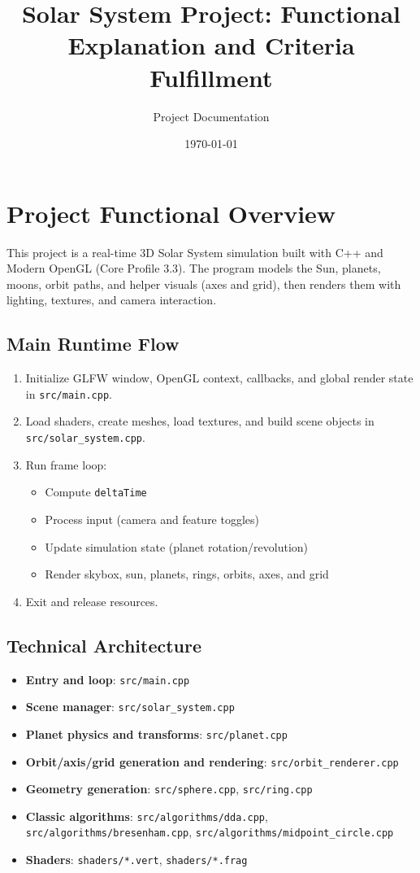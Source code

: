 \documentclass[11pt,a4paper]{article}
\title{Solar System Project: Functional Explanation and Criteria Fulfillment}
\author{Project Documentation}
\date{\today}
\begin{document}
\maketitle
\tableofcontents
\newpage

\section{Project Functional Overview}

This project is a real-time 3D Solar System simulation built with C++ and Modern OpenGL (Core Profile 3.3). The program models the Sun, planets, moons, orbit paths, and helper visuals (axes and grid), then renders them with lighting, textures, and camera interaction.

\subsection{Main Runtime Flow}
\begin{enumerate}[leftmargin=*]
    \item Initialize GLFW window, OpenGL context, callbacks, and global render state in \texttt{src/main.cpp}.
    \item Load shaders, create meshes, load textures, and build scene objects in \texttt{src/solar\_system.cpp}.
    \item Run frame loop:
    \begin{itemize}[leftmargin=*]
        \item Compute \texttt{deltaTime}
        \item Process input (camera and feature toggles)
        \item Update simulation state (planet rotation/revolution)
        \item Render skybox, sun, planets, rings, orbits, axes, and grid
    \end{itemize}
    \item Exit and release resources.
\end{enumerate}

\subsection{Technical Architecture}
\begin{itemize}[leftmargin=*]
    \item \textbf{Entry and loop}: \texttt{src/main.cpp}
    \item \textbf{Scene manager}: \texttt{src/solar\_system.cpp}
    \item \textbf{Planet physics and transforms}: \texttt{src/planet.cpp}
    \item \textbf{Orbit/axis/grid generation and rendering}: \texttt{src/orbit\_renderer.cpp}
    \item \textbf{Geometry generation}: \texttt{src/sphere.cpp}, \texttt{src/ring.cpp}
    \item \textbf{Classic algorithms}: \texttt{src/algorithms/dda.cpp}, \texttt{src/algorithms/bresenham.cpp}, \texttt{src/algorithms/midpoint\_circle.cpp}
    \item \textbf{Shaders}: \texttt{shaders/*.vert}, \texttt{shaders/*.frag}
\end{itemize}
\end{document}
